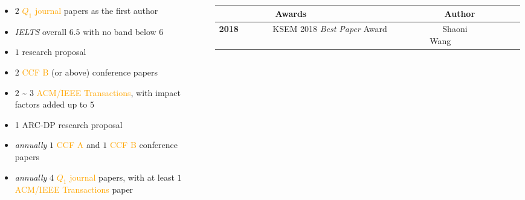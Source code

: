 \documentclass{tikzposter} %
\begin{document}
\begin{columns}
{\begin{minipage}[l]{0.45\linewidth}
\begin{description}[font=\small]
\begin{description}[font=\small]
\begin{itemize}
							\footnotesize \item $2$ \textcolor{orange}{$Q_1$ journal} papers as the first author
							\item \textit{IELTS} overall $6.5$ with no band below $6$
						\end{itemize}
					\end{description}
					\item[PhD Students] \hfill
					\begin{itemize}
						\footnotesize \item $1$ research proposal
						\item $2$ \textcolor{orange}{CCF B} (or above) conference papers
						\item $2$ \textasciitilde{} $3$ \textcolor{orange}{ACM/IEEE Transactions},
						with impact factors added up to $5$
					\end{itemize}
					\item[Post-doctoral Research Fellows] \hfill
					\begin{itemize}
						\footnotesize \item 1 ARC-DP research proposal
						\item \textit{annually} $1$ \textcolor{orange}{CCF A} and $1$ \textcolor{orange}{CCF B} conference papers
						\item \textit{annually} $4$ \textcolor{orange}{$Q_1$ journal} papers,
						with at least $1$ \textcolor{orange}{ACM/IEEE Transactions} paper
						
					\end{itemize}
					
				\end{description}		
			\end{minipage}
			


			
		}
		
		{
						\scalebox{1}
			{
				\begin{minipage}{\linewidth}
					\centering
					\small
					\begin{tabular}{ >{\centering}p{0.12\linewidth}  | p{0.58\linewidth} | p{0.18\linewidth}   r }
						\toprule
						\multicolumn{1}{ c |}{\textbf{Year}} & \textbf{~~~~Awards} & \textbf{~~~Author} &  \\
						\midrule
						\textbf{2018} & ~~~~KSEM 2018 \textit{Best Paper} Award & ~~~Shaoni Wang &  \\
						

\end{tabular}
\end{minipage}}}
\end{columns}
\end{document}
